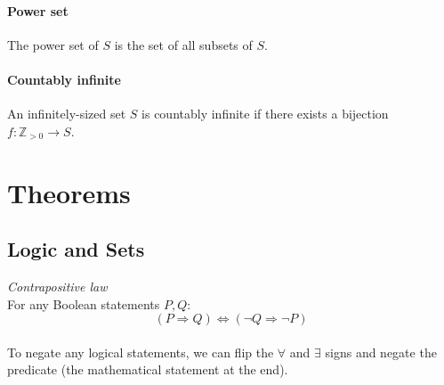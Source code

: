 \documentclass{scrartcl}
\newcommand{\Z}{\mathbb{Z}}
\begin{document}
\paragraph{Power set}
The power set of $ S $ is the set of all subsets of $ S $.

\paragraph{Countably infinite}
An infinitely-sized set $ S $ is countably infinite if there exists a bijection $ f : \Z_{> 0} \to S $.

\section{Theorems}

\subsection{Logic and Sets}
\textit{Contrapositive law}
\\
For any Boolean statements $ P, Q $:
\begin{equation}
(P \Rightarrow Q) \Leftrightarrow (\neg Q \Rightarrow \neg P)
\end{equation}
\\
To negate any logical statements, we can flip the $ \forall $ and $ \exists $ signs and negate the predicate (the mathematical statement at the end).
\end{document}
